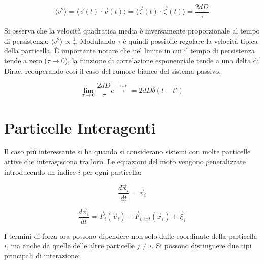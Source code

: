 \begin{equation} \label{eq:ch27_7}
\langle v^2 \rangle = \langle \vec{v}(t) \cdot \vec{v}(t) \rangle = \langle \vec{\zeta}(t) \cdot \vec{\zeta}(t) \rangle = \frac{2dD}{\tau}
\end{equation}

Si osserva che la velocità quadratica media è inversamente proporzionale al tempo di persistenza: $\langle v^2 \rangle \propto \frac{1}{\tau}$.
Modulando $\tau$ è quindi possibile regolare la velocità tipica della particella.
È importante notare che nel limite in cui il tempo di persistenza tende a zero ($\tau \to 0$), la funzione di correlazione esponenziale tende a una delta di Dirac, recuperando così il caso del rumore bianco del sistema passivo.

\begin{equation} \label{eq:ch27_8}
\lim_{\tau \to 0} \frac{2dD}{\tau}e^{-\frac{|t-t'|}{\tau}} = 2dD \delta(t-t')
\end{equation}


\section{Particelle Interagenti}
Il caso più interessante si ha quando si considerano sistemi con molte particelle attive che interagiscono tra loro. Le equazioni del moto vengono generalizzate introducendo un indice $i$ per ogni particella:

\begin{equation} \label{eq:ch27_9}
\frac{d\vec{x}_i}{dt}=\vec{v}_i
\end{equation}

\begin{equation} \label{eq:ch27_10}
\frac{d\vec{v}_i}{dt}=\vec{F}_{i}(\vec{v}_i) + \vec{F}_{i,ext}(\vec{x}_i) + \vec{\xi}_i
\end{equation}

I termini di forza ora possono dipendere non solo dalle coordinate della particella $i$, ma anche da quelle delle altre particelle $j \neq i$. Si possono distinguere due tipi principali di interazione:

